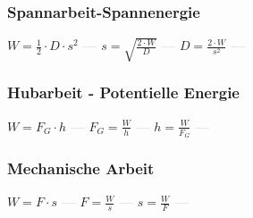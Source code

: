\subsubsection{Spannarbeit-Spannenergie} 
\begin{minipage}{0.45\textwidth} 
\end{minipage} 
\begin{minipage}{0.45\textwidth} 
 
\end{minipage} 
$ W =\frac{1}{2}\cdot D\cdot s^{2} $ \textcolor{lightgray}{\textbf{---}} 
$ s = \sqrt{\frac{2\cdot W}{ D}} $ \textcolor{lightgray}{\textbf{---}} 
$ D =\frac{2\cdot W}{s^{2} } $ \textcolor{lightgray}{\textbf{---}} 

\subsubsection{Hubarbeit - Potentielle Energie} 
\begin{minipage}{0.45\textwidth} 
\end{minipage} 
\begin{minipage}{0.45\textwidth} 
 
\end{minipage} 
$ W = F_{G} \cdot h $ \textcolor{lightgray}{\textbf{---}} 
$ F_{G}  = \frac{W}{h} $ \textcolor{lightgray}{\textbf{---}} 
$ h = \frac{W}{F_{G} } $ \textcolor{lightgray}{\textbf{---}} 

\subsubsection{Mechanische Arbeit} 
\begin{minipage}{0.45\textwidth} 
\end{minipage} 
\begin{minipage}{0.45\textwidth} 
 
\end{minipage} 
$ W = F\cdot s $ \textcolor{lightgray}{\textbf{---}} 
$ F = \frac{W}{s} $ \textcolor{lightgray}{\textbf{---}} 
$ s = \frac{W}{F} $ \textcolor{lightgray}{\textbf{---}} 

